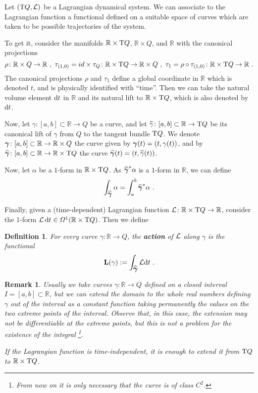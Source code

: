 \documentclass[12pt]{report}
\newtheorem{definition}[teor]{Definition}
\newtheorem{remark}[teor]{Remark}
\def\Lag{{\cal L}}
\def\d{{\rm d}}
\def\Real{\mathbb{R}}
\def\Tan{{\rm T}}
\begin{document}
Let $(\Tan Q,\Lag )$ be a Lagrangian dynamical system.
We can associate to the Lagrangian function a functional defined on a suitable space of curves 
which are taken to be possible trajectories of the system. 

To get it,  consider the manifolds
$\Real\times\Tan Q$, $\Real\times Q$, and $\Real$
with the canonical projections
$$
\rho\colon\Real\times Q\to \Real  \ , \
\tau_{(1,0)}=id\times\tau_Q\colon\Real\times\Tan Q \to\Real\times Q \ , \
\tau_1=\rho\circ\tau_{(1,0)}\colon\Real\times\Tan Q \to \Real \ .
$$
The canonical projections $\rho$ and $\tau_1$ define a global coordinate in $\Real$
which is denoted $t$, and is physically identified with ``time''.
Then we can take the natural volume element $\d t$ in $\Real$ and its natural lift to
$\Real\times\Tan Q$, which is also denoted by $\d t$.

Now, let $\gamma \colon [a,b]\subset\Real \to Q$ be a curve, 
and let $\widetilde\gamma \colon [a,b]\subset\Real \to \Tan Q$ be
its canonical lift of $\gamma$ from $Q$ to the tangent bundle $\Tan Q$.
We denote $\mbox{\boldmath$\gamma$}\colon[a,b]\subset\Real \to\Real\times Q$ 
the curve given by $\mbox{\boldmath$\gamma$}(t)=(t,\gamma(t))$,
and by $\widehat{\mbox{\boldmath$\gamma$}} \colon [a,b]\subset\Real  \to\Real\times \Tan Q$ 
the curve $\widehat{\mbox{\boldmath$\gamma$}}(t)=(t,\widetilde\gamma(t))$.

Now, let $\alpha$ be a $1$-form in $\Real\times\Tan Q$.
As $\widehat{\mbox{\boldmath$\gamma$}}^*\alpha$ is a $1$-form in $\Real$,
we can define
$$
\int_{\widehat{\mbox{\boldmath$\gamma$}}} \alpha = \int_a^b\widehat{\mbox{\boldmath$\gamma$}}^*\alpha \ .
$$

Finally, given a (time-dependent) Lagrangian function 
$\Lag\colon\Real\times\Tan Q\to\Real$, consider the $1$-form
$\Lag\,\d t \in {\mit\Omega}^1(\Real\times\Tan Q)$.
Then we define

\begin{definition}
For every curve $\gamma \colon \Real \to Q$, the
\textbf{action} of $\Lag$ along $\gamma$ is the functional
$$
{\mathbf L}(\gamma ) := \int_{\widehat{\mbox{\boldmath$\gamma$}}} \Lag\d t \ .
$$
\end{definition}

\begin{remark}{\rm 
Usually we take curves 
$\gamma \colon \Real \to Q$ defined on a closed  interval
$I=[a,b]\subset\Real$, but we can extend the domain to the whole real numbers defining $\gamma$ out of the interval  as a constant function taking permanently the values on the two extreme points of the interval. Observe that, in this case, the extension may not be differentiable at the extreme points, but this is not a problem for the existence of the integral
\footnote{
From now on it is only necessary that the curve is of class $C^2$.}.

If the Lagrangian function is time-independent, 
it is enough to extend it from $\Tan Q$ to $\Real\times\Tan Q$.
}\end{remark}
\end{document}
